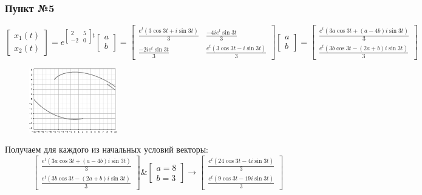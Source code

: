\documentclass[a3paper,14pt]{extarticle}
\begin{document}
\subsubsection*{Пункт №5}
$$\begin{bmatrix}
    x_1(t) \\ x_2(t)
\end{bmatrix} = e^{\left[\begin{smallmatrix}
    2 & 5 \\ -2 & 0
\end{smallmatrix}\right]t}\begin{bmatrix}
    a \\ b
\end{bmatrix} = \begin{bmatrix}
    \frac{e^t(3\cos{3t}+i\sin{3t})}{3} & \frac{-4ie^t\sin{3t}}{3} \\
    \frac{-2ie^t\sin{3t}}{3} & \frac{e^t(3\cos{3t}-i\sin{3t})}{3}
\end{bmatrix}\begin{bmatrix}
    a \\ b
\end{bmatrix} = \begin{bmatrix}
    \frac{e^t(3a\cos{3t}+(a-4b)i\sin{3t})}{3} \\
    \frac{e^t(3b\cos{3t}-(2a+b)i\sin{3t})}{3}
\end{bmatrix}$$
\begin{figure}
    \centering
    \includegraphics[width=0.34\textwidth]{2.6.png}
\end{figure}
Получаем для каждого из начальных условий векторы: $$\begin{bmatrix}
    \frac{e^t(3a\cos{3t}+(a-4b)i\sin{3t})}{3} \\
    \frac{e^t(3b\cos{3t}-(2a+b)i\sin{3t})}{3}
\end{bmatrix} \& \begin{bmatrix}
    a = 8 \\ b = 3
\end{bmatrix} \rightarrow \begin{bmatrix}
    \frac{e^t(24\cos{3t}-4i\sin{3t})}{3} \\
    \frac{e^t(9\cos{3t}-19i\sin{3t})}{3}
\end{bmatrix}$$
\end{document}
